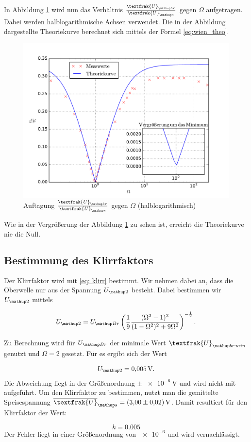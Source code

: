 In Abbildung \ref{fig: plot}
wird nun das Verhältnis $\frac{\textfrak{U}\ua{br}}{\textfrak{U}\ua{s}}$
gegen $\Omega$ aufgetragen. Dabei werden halblogarithmische Achsen verwendet. %
Die in der Abbildung dargestellte Theoriekurve berechnet sich mittels der Formel
\eqref{eq:wien_theo}.

\begin{figure}
  \centering
  \includegraphics[width=1\textwidth]{pics/ub_us.pdf}
  \caption{Auftagung $\frac{\textfrak{U}\ua{br}}{\textfrak{U}\ua{s}}$  gegen $\Omega$ (halblogarithmisch) }
  \label{fig: plot}
\end{figure}

Wie in der Vergrößerung der Abbildung \ref{fig: plot} zu sehen ist, erreicht die %
Theoriekurve nie die Null.

\subsection{Bestimmung des Klirrfaktors}

Der Klirrfaktor wird mit \eqref{eq: klirr} bestimmt.
Wir nehmen dabei an, dass die Oberwelle nur aus der Spannung $U\ua{2}$ besteht. %
Dabei bestimmen wir $U\ua{2}$ mittels

\begin{equation*}
 U\ua{2}=U\ua{Br}\left(\frac{1}{9} \frac{(\Omega^2 - 1)^2 }{(1 - \Omega ^2)^2 + 9 \Omega ^2}\right)^{-\frac{1}{2}}. %
\end{equation*}

Zu Berechnung wird für $U\ua{Br}$ der minimale Wert $\textfrak{U}\ua{br\,min}$ %
genutzt und $\Omega=2$ gesetzt.
Für es ergibt sich der Wert %

\begin{equation*}
 U\ua{2}=\SI{0.005}{\volt}.
\end{equation*}
Die Abweichung liegt in der Größenordnung $\pm \, \SI{e-6}{\volt}$ und
wird nicht mit aufgeführt.
Um den Klirrfaktor zu bestimmen, nutzt man die gemittelte Speisespannung
$\overline{\textfrak{U}}\ua{s}=\SI{3.0\pm0.02}{\volt}$.
Damit resultiert für den Klirrfaktor der Wert:

\begin{equation*}
k=0.005
\end{equation*}
Der Fehler liegt in einer Größenordnung von $\num{e-6}$ und wird vernachlässigt.
